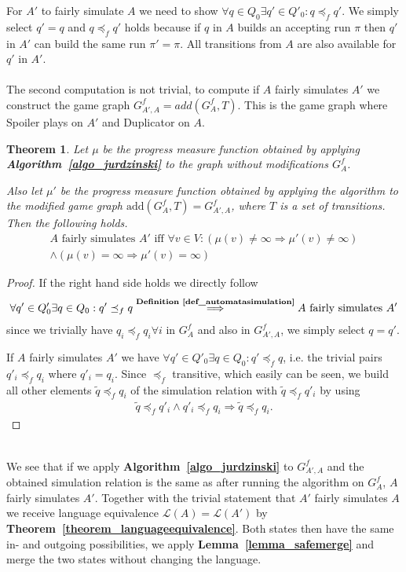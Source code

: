 \documentclass[12pt,oneside,bibliography=totoc,abstracton]{scrartcl}
\newcommand{\lemmaref}[1]{\textbf{Lemma~\ref{#1}}}
\newcommand{\theoremref}[1]{\textbf{Theorem~\ref{#1}}}
\newcommand{\algoref}[1]{\textbf{Algorithm~\ref{#1}}}
\newcommand{\defref}[1]{\textbf{Definition~\ref{#1}}}
\newtheorem{mytheorem}{Theorem}
\begin{document}
For $A'$ to fairly simulate $A$ we need to show $\forall q \in Q_0 \exists q' \in Q'_0 : q \preceq_f q'$. We simply select $q' = q$
and $q \preceq_f q'$ holds because if $q$ in $A$ builds an accepting run $\pi$ then $q'$ in $A'$ can build the same run
$\pi' = \pi$. All transitions from $A$ are also available for $q'$ in $A'$.\\\\
The second computation is not trivial, to compute if $A$ fairly simulates $A'$ we construct the game graph $G^f_{A', A} = add(G^f_A, T)$.
This is the game graph where Spoiler plays on $A'$ and Duplicator on $A$.
\begin{mytheorem}\label{theorem_modificatedsimulation}
	Let $\mu$ be the progress measure function obtained by applying \algoref{algo_jurdzinski} to the graph
	without modifications $G^f_A$.
	
	Also let $\mu'$ be the progress measure function obtained by applying the algorithm to the modified game graph
	$\text{add}(G^f_A, T) = G^f_{A', A}$, where $T$ is a set of transitions.
	Then the following holds.
	\begin{align*}
		A \text{ fairly simulates } A' \text{ iff } \forall v \in V : (\mu(v) \neq \infty \Rightarrow \mu'(v) \neq \infty)\\
		\land (\mu(v) = \infty \Rightarrow \mu'(v) = \infty)
	\end{align*}
\end{mytheorem}
\begin{proof}
	If the right hand side holds we directly follow
	\begin{align*}
		\forall q' \in Q'_0 \exists q \in Q_0 : q' \preceq_f q
		\overset{\defref{def_automatasimulation}}{\Longrightarrow} A \text{ fairly simulates } A'
	\end{align*}
	since we trivially have $q_i \preceq_f q_i \forall i$ in $G^f_A$ and also in $G^f_{A', A}$, we simply select $q = q'$.
	
	If $A$ fairly simulates $A'$ we have $\forall q' \in Q'_0 \exists q \in Q_0 : q' \preceq_f q$,
	i.e. the trivial pairs $q'_i \preceq_f q_i$ where $q'_i = q_i$.
	Since $\preceq_f$ transitive, which easily can be seen, we build all other
	elements $\tilde{q} \preceq_f q_i$ of the simulation relation with $\tilde{q} \preceq_f q'_i$ by using
	\begin{align*}
		\tilde{q} \preceq_f q'_i \land q'_i \preceq_f q_i \Rightarrow \tilde{q} \preceq_f q_i.
	\end{align*}
\end{proof}\quad\\
We see that if we apply \algoref{algo_jurdzinski} to $G^f_{A', A}$ and the obtained simulation relation
is the same as after running the algorithm on $G^f_A$, $A$ fairly simulates $A'$.
Together with the trivial statement that $A'$ fairly simulates $A$ we receive language equivalence
$\mathcal{L}(A) = \mathcal{L}(A')$ by \theoremref{theorem_languageequivalence}.
Both states then have the same in- and outgoing possibilities, we
apply \lemmaref{lemma_safemerge} and merge the two states without changing the language.
\end{document}
